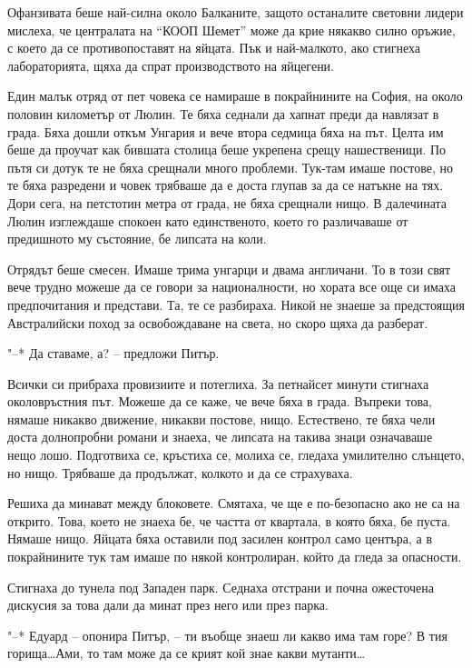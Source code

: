 \documentclass[ebook,openany,12pt]{memoir}
\begin{document}
Офанзивата беше най-силна около Балканите, защото останалите световни лидери мислеха, че централата на ``КООП Шемет'' може да крие някакво силно оръжие, с което да се противопоставят на яйцата. Пък и най-малкото, ако стигнеха лабораторията, щяха да спрат производството на яйцегени.

Един малък отряд от пет човека се намираше в покрайнините на София, на около половин километър от Люлин. Те бяха седнали да хапнат преди да навлязат в града. Бяха дошли откъм Унгария и вече втора седмица бяха на път. Целта им беше да проучат как бившата столица беше укрепена срещу нашественици. По пътя си дотук те не бяха срещнали много проблеми. Тук-там имаше постове, но те бяха разредени и човек трябваше да е доста глупав за да се натъкне на тях. Дори сега, на петстотин метра от града, не бяха срещнали нищо. В далечината Люлин изглеждаше спокоен като единственото, което го различаваше от предишното му състояние, бе липсата на коли.

Отрядът беше смесен. Имаше трима унгарци и двама англичани. То в този свят вече трудно можеше да се говори за националности, но хората все още си имаха предпочитания и представи. Та, те се разбираха. Никой не знаеше за предстоящия Австралийски поход за освобождаване на света, но скоро щяха да разберат.

"--* Да ставаме, а? – предложи Питър.

Всички си прибраха провизиите и потеглиха. За петнайсет минути стигнаха околовръстния път. Можеше да се каже, че вече бяха в града. Въпреки това, нямаше никакво движение, никакви постове, нищо. Естествено, те бяха чели доста долнопробни романи и знаеха, че липсата на такива знаци означаваше нещо лошо. Подготвиха се, кръстиха се, молиха се, гледаха умилително слънцето, но нищо. Трябваше да продължат, колкото и да се страхуваха.

Решиха да минават между блоковете. Смятаха, че ще е по-безопасно ако не са на открито. Това, което не знаеха бе, че частта от квартала, в която бяха, бе пуста. Нямаше нищо. Яйцата бяха оставили под засилен контрол само центъра, а в покрайнините тук там имаше по някой контролиран, който да гледа за опасности.

Стигнаха до тунела под Западен парк. Седнаха отстрани и почна ожесточена дискусия за това дали да минат през него или през парка.

"--* Едуард -- опонира Питър, – ти въобще знаеш ли какво има там горе? В тия горища\ldots Ами, то там може да се крият кой знае какви мутанти\ldots
\end{document}
